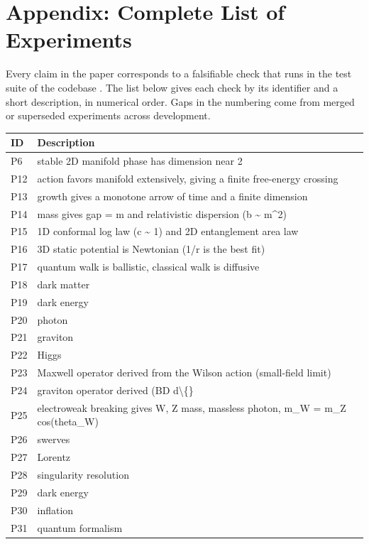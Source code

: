 \section{Appendix: Complete List of Experiments}

Every claim in the paper corresponds to a falsifiable check that runs in the test suite of the codebase \cite{pollard2026vibetest}. The list below gives each check by its identifier and a short description, in numerical order. Gaps in the numbering come from merged or superseded experiments across development.

\begin{small}
\begin{longtable}{p{0.7cm}p{13.5cm}}
\toprule
\textbf{ID} & \textbf{Description} \\
\midrule
\endhead
P6 & stable 2D manifold phase has dimension near 2 \\
P12 & action favors manifold extensively, giving a finite free-energy crossing \\
P13 & growth gives a monotone arrow of time and a finite dimension \\
P14 & mass gives gap = m and relativistic dispersion (b \textasciitilde{} m\textasciicircum{}2) \\
P15 & 1D conformal log law (c \textasciitilde{} 1) and 2D entanglement area law \\
P16 & 3D static potential is Newtonian (1/r is the best fit) \\
P17 & quantum walk is ballistic, classical walk is diffusive \\
P18 & dark matter \\
P19 & dark energy \\
P20 & photon \\
P21 & graviton \\
P22 & Higgs \\
P23 & Maxwell operator derived from the Wilson action (small-field limit) \\
P24 & graviton operator derived (BD d\textbackslash\{\} \\
P25 & electroweak breaking gives W, Z mass, massless photon, m\_W = m\_Z cos(theta\_W) \\
P26 & swerves \\
P27 & Lorentz \\
P28 & singularity resolution \\
P29 & dark energy \\
P30 & inflation \\
P31 & quantum formalism \\

\end{longtable}
\end{small}
